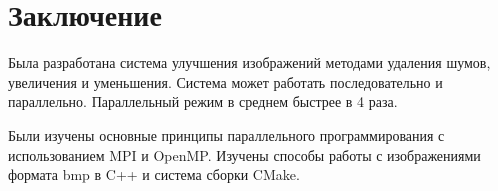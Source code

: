 \newpage


\section*{Заключение}
Была разработана система улучшения изображений методами удаления шумов, увеличения и уменьшения.
Система может работать последовательно и параллельно.
Параллельный режим в среднем быстрее в 4 раза.

Были изучены основные принципы параллельного программирования с использованием MPI и OpenMP.
Изучены способы работы с изображениями формата bmp в C++ и система сборки CMake.